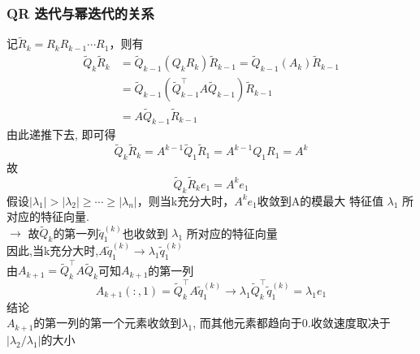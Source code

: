 \documentclass[12pt,a4paper]{article}
\begin{document}
\subsubsection{QR 迭代与幂迭代的关系}
记$\tilde{R}_{k}=R_{k} R_{k-1} \cdots R_{1}$，则有
$$
\begin{aligned} 
\tilde{Q}_{k} \tilde{R}_{k} &=\tilde{Q}_{k-1}\left(Q_{k} R_{k}\right) \tilde{R}_{k-1}=\tilde{Q}_{k-1}\left(A_{k}\right) \tilde{R}_{k-1} \\ 
&=\tilde{Q}_{k-1}\left(\tilde{Q}_{k-1}^{\top} A \tilde{Q}_{k-1}\right) \tilde{R}_{k-1} \\ 
&=A \tilde{Q}_{k-1} \tilde{R}_{k-1} 
\end{aligned}
$$
由此递推下去, 即可得
$$
\tilde{Q}_{k} \tilde{R}_{k}=A^{k-1} \tilde{Q}_{1} \tilde{R}_{1}=A^{k-1} Q_{1} R_{1}=A^{k}
$$
故
$$
\tilde{Q}_{k} \tilde{R}_{k} e_{1}=A^{k} e_{1}
$$
假设$\left|\lambda_{1}\right|>\left|\lambda_{2}\right| \geq \cdots \geq\left|\lambda_{n}\right|$，则当k充分大时，$A^{k} e_{1}$收敛到A的模最大 特征值 $\lambda_{1}$ 所对应的特征向量.\\
$\rightarrow$ 故$\tilde{Q}_{k}$的第一列$\tilde{q}_{1}^{(k)}$也收敛到 $\lambda_{1}$ 所对应的特征向量\\
因此,当k充分大时,$A \tilde{q}_{1}^{(k)} \rightarrow \lambda_{1} \tilde{q}_{1}^{(k)}$\\
由$A_{k+1}=\tilde{Q}_{k}^{\top} A \tilde{Q}_{k}$可知$A_{k+1}$的第一列
$$
A_{k+1}( :, 1)=\tilde{Q}_{k}^{\top} A \tilde{q}_{1}^{(k)} \rightarrow \lambda_{1} \tilde{Q}_{k}^{\top} \tilde{q}_{1}^{(k)}=\lambda_{1} e_{1}
$$
结论\\
$A_{k+1}$的第一列的第一个元素收敛到$\lambda_{1}$, 而其他元素都趋向于0.收敛速度取决于$|\lambda_{2}/\lambda_{1}|$的大小
\end{document}
